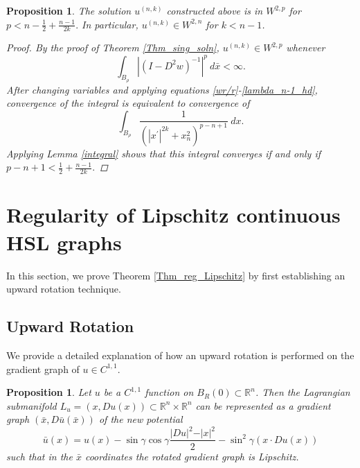 \documentclass[12pt,reqno]{amsart}%
\theoremstyle{plain}
\newtheorem{proposition}[theorem]{Proposition}
\numberwithin{equation}{section}
\theoremstyle{definition}
\theoremstyle{remark}
\def\re{\mathbb{R}}
\begin{document}
\begin{proposition} The solution $u^{(n,k)}$ constructed above is in $W^{2,p}$ for $p < n - \frac 12 + \frac {n-1}{2k} .$ In particular, $u^{(n,k)} \in W^{2,n} $ for $k < n-1$. 

\begin{proof} 
By the proof of Theorem \ref{Thm_sing_soln}, $u^{(n,k)} \in W^{2,p} $ whenever 
$$ \int_{B_\rho} | (I - D^2 w ) ^{-1}|^p \: d\bar x < \infty. $$
After changing variables and applying equations \eqref{wr/r}-\eqref{lambda_n-1_hd}, convergence of the integral is equivalent to convergence of 
$$ \int _{B_\rho } \frac{ 1}{(|x^\prime |^{2k} + x_n^2 )^{p - n + 1}} \: dx .$$
Applying Lemma \ref{integral} shows that this integral converges if and only if $ p - n+1 <  \frac 12 + \frac { n -1 }{2k} .$
\end{proof} 

\end{proposition} 














\section{Regularity of Lipschitz continuous HSL graphs}\label{Sec_Lipschitz}



In this section, we prove  Theorem \ref{Thm_reg_Lipschitz} by first establishing an upward rotation technique.
















\subsection{Upward Rotation} \label{Sec_up_rot} We provide a detailed explanation of how an upward rotation is performed on the gradient graph of $u\in C^{1,1}$. 

\begin{proposition}\label{upward}
    Let $u$ be a $C^{1,1}$ function on $B_R(0)\subset \re^n$. Then the Lagrangian submanifold $ L_u=(x,Du(x))\subset \re^n\times \re^n$ can be represented as a gradient graph $(\bar{x},D\bar{u}(\bar{x}))$ of the new potential \begin{equation}
    \bar{u}(x)=u(x)-\sin\gamma\cos\gamma\frac{\vert Du\vert ^2-\vert x\vert^2}{2}-\sin^2\gamma (x\cdot Du(x)) \label{ubar}
    \end{equation}
    such that in the $\bar x$ coordinates the rotated gradient graph is Lipschitz.
\end{proposition}
\end{document}
